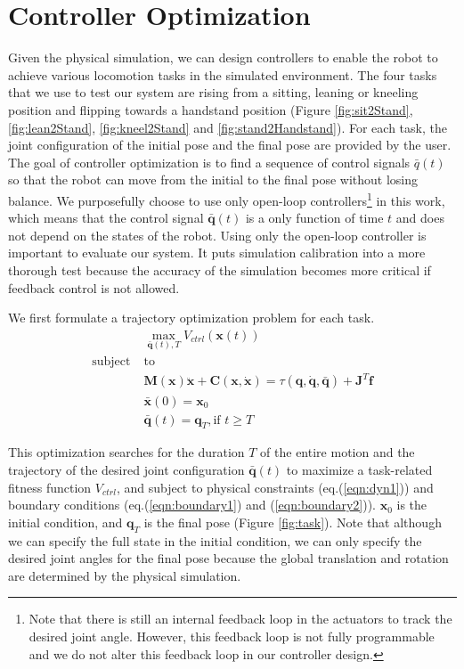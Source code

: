 \section{Controller Optimization}

Given the physical simulation, we can design controllers to enable the robot to achieve various locomotion tasks in the simulated environment. The four tasks that we use to test our system are rising from a sitting, leaning or kneeling position and flipping towards a handstand position (Figure \ref{fig:sit2Stand}, \ref{fig:lean2Stand}, \ref{fig:kneel2Stand} and \ref{fig:stand2Handstand}). For each task, the joint configuration of the initial pose and the final pose are provided by the user. The goal of controller optimization is to find a sequence of control signals $\bar{q}(t)$ so that the robot can move from the initial to the final pose without losing balance. We purposefully choose to use only open-loop controllers\footnote{Note that there is still an internal feedback loop in the actuators to track the desired joint angle. However, this feedback loop is not fully programmable and we do not alter this feedback loop in our controller design.} in this work, which means that the control signal $\bar{\mathbf{q}}(t)$ is a only function of time $t$ and does not depend on the states of the robot. Using only the open-loop controller is important to evaluate our system. It puts simulation calibration into a more thorough test because the accuracy of the simulation becomes more critical if feedback control is not allowed.

We first formulate a trajectory optimization problem for each task.
\begin{align}
 \label{eqn:obj}&\max_{\bar{\mathbf{q}}(t),T} V_{ctrl}(\mathbf{x}(t))\\
\nonumber  \mathrm{subject\;} &\mathrm{to} \\
\label{eqn:dyn1} & \mathbf{M}(\mathbf{x})\mathbf{\ddot{x}}+\mathbf{C}(\mathbf{x},\mathbf{\dot{x}}) =\tau(\mathbf{q}, \dot{\mathbf{q}}, \bar{\mathbf{q}}) + \mathbf{J}^T\mathbf{f}\\
\label{eqn:boundary1}&\bar{\mathbf{x}}(0) = \mathbf{x}_0\\
\label{eqn:boundary2}&\bar{\mathbf{q}}(t) = \mathbf{q}_T, \text{if } t \geq T
\end{align}

This optimization searches for the duration $T$ of the entire motion and the trajectory of the desired joint configuration $\bar{\mathbf{q}}(t)$ to maximize a task-related fitness function $V_{ctrl}$, and subject to physical constraints (eq.(\ref{eqn:dyn1})) and boundary conditions (eq.(\ref{eqn:boundary1}) and (\ref{eqn:boundary2})). $\mathbf{x}_0$ is the initial condition, and $\mathbf{q}_T$ is the final pose (Figure \ref{fig:task}). Note that although we can specify the full state in the initial condition, we can only specify the desired joint angles for the final pose because the global translation and rotation are determined by the physical simulation.

